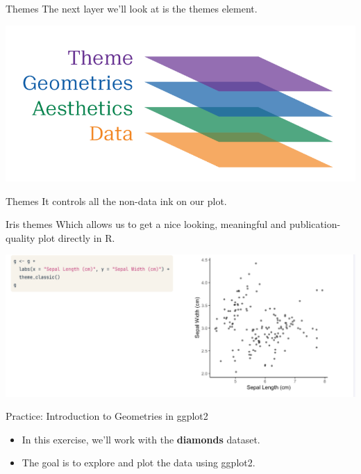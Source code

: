 \documentclass[
  ignorenonframetext,
]{beamer}
\providecommand{\tightlist}{%
  \setlength{\itemsep}{0pt}\setlength{\parskip}{0pt}}
\begin{document}
\begin{frame}{Themes}
\label{themes}
The next layer we'll look at is the themes element.

\includegraphics{../images/im133.png}
\end{frame}

\begin{frame}{Themes}
\label{themes-1}
It controls all the non-data ink on our plot.
\end{frame}

\begin{frame}{Iris themes}
\label{iris-themes}
Which allows us to get a nice looking, meaningful and
publication-quality plot directly in R.

\includegraphics{../images/im134.png}
\end{frame}

\begin{frame}{Practice: Introduction to Geometries in ggplot2}
\label{practice-introduction-to-geometries-in-ggplot2}
\begin{itemize}
\tightlist
\item
  In this exercise, we'll work with the \textbf{diamonds} dataset.
\item
  The goal is to explore and plot the data using ggplot2.
\end{itemize}
\end{frame}
\end{document}

